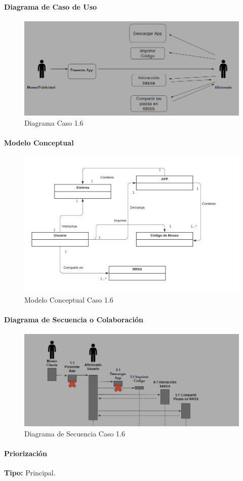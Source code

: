 \paragraph{Diagrama de Caso de Uso}

\begin{figure}[H]
\centerline{\includegraphics[width=15cm]{imgs/CasoUso_6.PNG}}
\caption{Diagrama Caso 1.6}
\label{fig_6_1}
\end{figure}

\paragraph{Modelo Conceptual}

\begin{figure}[H]
\centerline{\includegraphics[width=15cm]{imgs/ModeloConceptualCaso_6_3.png}}
\caption{Modelo Conceptual Caso 1.6}
\label{fig_6_2}
\end{figure}

\paragraph{Diagrama de Secuencia o Colaboración}

\begin{figure}[H]
\centerline{\includegraphics[width=15cm]{imgs/CasoUso_6_2.PNG}}
\caption{Diagrama de Secuencia Caso 1.6}
\label{fig_6_3}
\end{figure}

\paragraph{Priorización}
{\textbf {Tipo:}}
Principal.